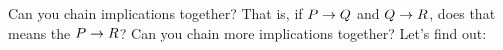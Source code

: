 \begin{questions}
\begin{parts}
\end{parts}




\question Can you chain implications together?  That is, if $P \rightarrow Q$ and $Q \rightarrow R$, does that means the $P \rightarrow R$?  Can you chain more implications together?  Let's find out:
\end{questions}
